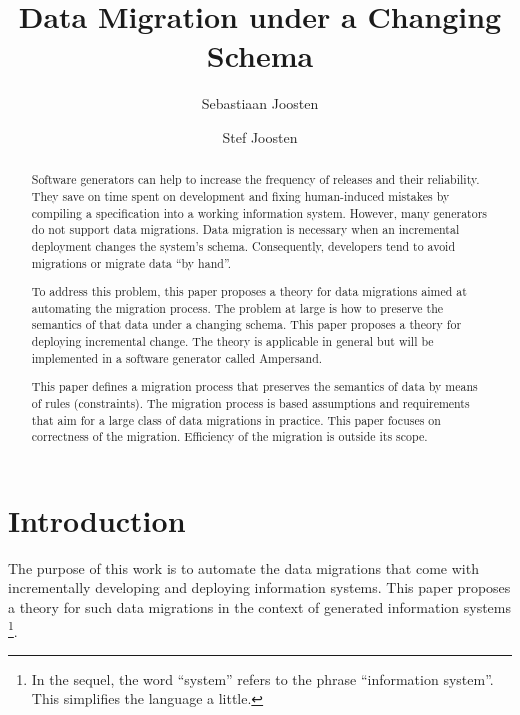 \documentclass[runningheads]{llncs}
\begin{document}
%

\title{Data Migration under a Changing Schema}
%
%
\author{Sebastiaan Joosten\\ \and
Stef Joosten}
%
%
%
\maketitle              %
%
\begin{abstract}  %
Software generators can help to increase the frequency of releases and their reliability.
They save on time spent on development and fixing human-induced mistakes by compiling a specification into a working information system.
However, many generators do not support data migrations.
Data migration is necessary when an incremental deployment changes the system's schema.
Consequently, developers tend to avoid migrations or migrate data ``by hand''.

To address this problem, this paper proposes a theory for data migrations aimed at automating the migration process.
The problem at large is how to preserve the semantics of that data under a changing schema.
This paper proposes a theory for deploying incremental change.
The theory is applicable in general but will be implemented in a software generator called Ampersand.

This paper defines a migration process that preserves the semantics of data by means of rules (constraints).
The migration process is based assumptions and requirements that aim for a large class of data migrations in practice.
This paper focuses on correctness of the migration. Efficiency of the migration is outside its scope.

\end{abstract}
%
%
%
\section{Introduction}
\label{sct:Introduction}
   The purpose of this work is to automate the data migrations that come with incrementally developing and deploying information systems.
   This paper proposes a theory for such data migrations in the context of generated information systems%
\footnote{In the sequel, the word ``system'' refers to the phrase ``information system''. This simplifies the language a little. }.
\end{document}
